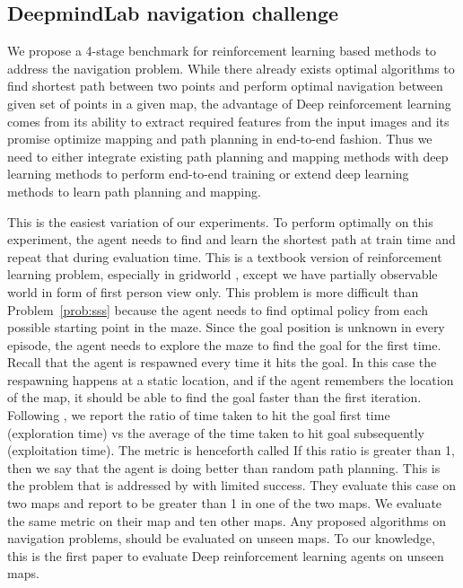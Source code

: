 

\subsection{DeepmindLab navigation challenge}
We propose a 4-stage benchmark for reinforcement learning based methods to address the navigation problem.
While there already exists optimal algorithms to find shortest path between two points and perform optimal navigation between given set of points in a given map, the advantage of Deep reinforcement learning comes from its ability to extract required features from the input images and its promise
optimize mapping and path planning in end-to-end fashion. 
Thus we need to either integrate existing path planning and mapping methods with deep learning methods to perform end-to-end training or extend deep learning methods to learn path planning and mapping.

\begin{description}
  \label{prob:sss}
   This is the easiest variation of our experiments. To perform
   optimally on this experiment, the agent needs to find and learn the
   shortest path at train time and repeat that during evaluation time.
  This is a textbook version of reinforcement learning problem, especially in gridworld \cite{SuBaBOOK1998}, except we have partially observable world in form of first person view only.
  This problem is more difficult than Problem~\ref{prob:sss} because the agent
  needs to find optimal policy from each possible starting point in the maze.
  Since the goal position is unknown in every episode, the agent needs to explore the maze to find the goal for the first time. Recall that the agent is respawned every time it hits the goal.
  In this case the respawning happens at a static location, and if the agent remembers the location of the map, it should be able to find the goal faster than
  the first iteration.
  Following \cite{MiPaViICLR2017}, we report the ratio
  of time taken to hit the goal first time (exploration time) vs the average of the time taken to hit goal subsequently (exploitation time). The metric is henceforth called \LatencyOneGtOne
  If this ratio is greater than 1, then we say that the agent is doing better than random path planning.
    This is the problem that is addressed by \cite{MiPaViICLR2017}
    with limited success. They evaluate this case on two maps and report \LatencyOneGtOne to be greater than 1 in one of the two maps. We evaluate the same metric on their map and ten other maps.
    Any proposed algorithms on navigation problems, should be evaluated on unseen maps.
    To our knowledge, this is the first paper to evaluate Deep reinforcement learning agents on unseen maps.
\end{description}

